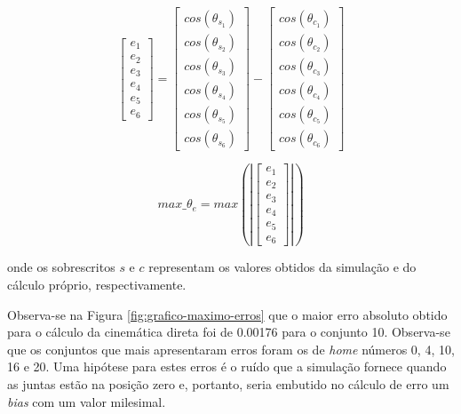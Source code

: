 \begin{equation}\label{eq:erro-de-valores-de-juntas}
	\begin{bmatrix}
		e_{1} \\ 
		e_{2} \\ 
		e_{3} \\
		e_{4} \\
		e_{5} \\
		e_{6}
	\end{bmatrix}
	=
	\begin{bmatrix}
		cos(\theta_{s_{1}}) \\ 
		cos(\theta_{s_{2}}) \\ 
		cos(\theta_{s_{3}}) \\
		cos(\theta_{s_{4}}) \\
		cos(\theta_{s_{5}}) \\
		cos(\theta_{s_{6}})
	\end{bmatrix}
-
	\begin{bmatrix}
		cos(\theta_{c_{1}}) \\ 
		cos(\theta_{c_{2}}) \\ 
		cos(\theta_{c_{3}}) \\
		cos(\theta_{c_{4}}) \\
		cos(\theta_{c_{5}}) \\
		cos(\theta_{c_{6}})
	\end{bmatrix}
\end{equation}

\begin{equation}\label{eq:max-erro-de-valores-de-juntas}
	 max\_\theta_{e} = max\left(\left|
	\begin{bmatrix}
		e_{1} \\ 
		e_{2} \\ 
		e_{3} \\
		e_{4} \\
		e_{5} \\
		e_{6}
	\end{bmatrix}
	\right|\right)
\end{equation}

onde os sobrescritos $s$ e $c$ representam os valores obtidos da simulação e do cálculo próprio,
respectivamente.

Observa-se na Figura \ref{fig:grafico-maximo-erros} que o maior erro absoluto obtido para o cálculo da
cinemática direta foi de 0.00176 para o conjunto 10. Observa-se que os conjuntos que mais apresentaram
erros foram os de \textit{home} números 0, 4, 10, 16 e 20. Uma hipótese para estes erros é o ruído que a
simulação fornece quando as juntas estão na posição zero e, portanto, seria embutido no cálculo de erro
um \textit{bias} com um valor milesimal.

